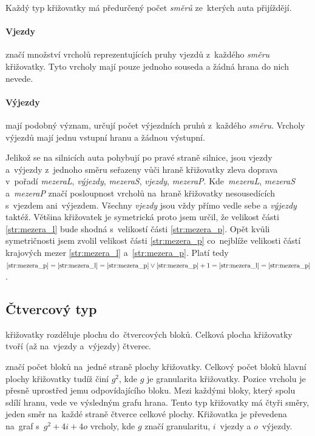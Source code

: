 Každý typ křižovatky má předurčený počet \emph{směrů} ze~kterých auta přijíždějí.

\paragraph{Vjezdy}\label{par:vjezdy} značí množství vrcholů reprezentujících pruhy vjezdů z~každého \emph{směru} křižovatky.
Tyto vrcholy mají pouze jednoho souseda a žádná hrana do nich nevede.

\paragraph{Výjezdy}\label{par:vyjezdy} mají podobný význam, určují počet výjezdních pruhů z~každého \emph{směru}.
Vrcholy výjezdů mají jednu vstupní hranu a žádnou výstupní.

Jelikož se na silnicích auta pohybují po pravé straně silnice,
jsou vjezdy a~výjezdy z~jednoho směru seřazeny vůči hraně křižovatky zleva doprava v~pořadí
\emph{mezeraL}, \emph{výjezdy}, \emph{mezeraS}, \emph{vjezdy}, \emph{mezeraP}.
Kde~\emph{mezeraL}, \emph{mezeraS}
a~\emph{mezeraP} značí posloupnost vrcholů na~hraně křižovatky
nesousedících s~vjezdem ani~výjezdem.
Všechny \emph{vjezdy} jsou vždy přímo vedle sebe a \emph{výjezdy} taktéž.
Většina křižovatek je symetrická proto jsem určil, že velikost části \ref{str:mezera_l} bude shodná s~velikostí části \ref{str:mezera_p}.
Opět kvůli symetričnosti jsem zvolil velikost části \ref{str:mezera_p} co~nejblíže velikosti
částí krajových mezer \ref{str:mezera_l} a~\ref{str:mezera_p}.
Platí tedy $\ref{str:mezera_p}=\ref{str:mezera_l}=\ref{str:mezera_p}\vee\ref{str:mezera_p}+1=\ref{str:mezera_l}=\ref{str:mezera_p}$.

\subsection{Čtvercový typ}\label{subsec:ctvercovy_typ}

 křižovatky rozděluje plochu do~čtvercových bloků.
Celková plocha křižovatky tvoří (až na~vjezdy a~výjezdy) čtverec.

 značí počet bloků na~jedné straně plochy křižovatky.
Celkový počet bloků hlavní plochy křižovatky tudíž činí $g^2$, kde $g$ je granularita křižovatky.
Pozice vrcholu je přesně uprostřed jemu odpovídajícího bloku.
Mezi každými bloky, který spolu sdílí hranu, vede ve výsledným grafu hrana.
Tento typ křižovatky má čtyři směry, jeden směr na~každé straně čtverce celkové plochy.
Křižovatka je převedena na~graf s~$g^2 + 4i + 4o$ vrcholy, kde $g$ značí granularitu, $i$~vjezdy a $o$~výjezdy.

